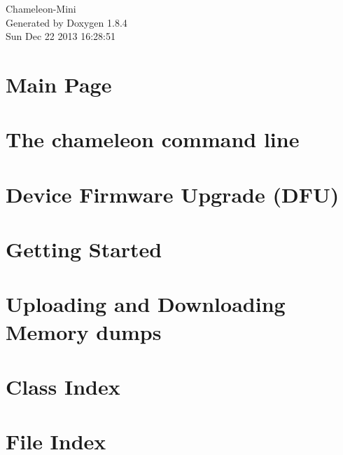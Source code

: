 \documentclass[twoside]{book}
\newcommand{\clearemptydoublepage}{%
  \newpage{\pagestyle{empty}\cleardoublepage}%
}
\begin{document}
\hypersetup{pageanchor=false}
\begin{titlepage}
\vspace*{7cm}
\begin{center}%
{\Large Chameleon-\/\-Mini }\\
\vspace*{1cm}
{\large Generated by Doxygen 1.8.4}\\
\vspace*{0.5cm}
{\small Sun Dec 22 2013 16:28:51}\\
\end{center}
\end{titlepage}
\clearemptydoublepage
\tableofcontents
\clearemptydoublepage
{}
\hypersetup{pageanchor=true}

\chapter{Main Page}
\label{index}\hypertarget{index}{}
\chapter{The chameleon command line}
\label{Page_CommandLine}
\hypertarget{Page_CommandLine}{}

\chapter{Device Firmware Upgrade (D\-F\-U)}
\label{Page_FirmwareUpgrade}
\hypertarget{Page_FirmwareUpgrade}{}

\chapter{Getting Started}
\label{Page_GettingStarted}
\hypertarget{Page_GettingStarted}{}

\chapter{Uploading and Downloading Memory dumps}
\label{Page_UploadingDownloading}
\hypertarget{Page_UploadingDownloading}{}

\chapter{Class Index}

\chapter{File Index}

\end{document}
